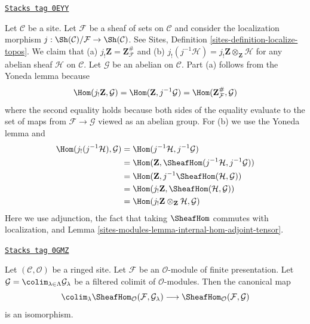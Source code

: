 \begin{remark}
\label{sites-modules-remark-j-shriek-tensor}
\href{https://stacks.math.columbia.edu/tag/0EYY}{\texttt{Stacks tag 0EYY}}

Let $\mathcal{C}$ be a site. Let $\mathcal{F}$ be a sheaf of
sets on $\mathcal{C}$ and consider the localization morphism
$j : \Sh(\mathcal{C})/\mathcal{F} \to \Sh(\mathcal{C})$.
See Sites, Definition \ref{sites-definition-localize-topos}.
We claim that (a) $j_!\mathbf{Z} = \mathbf{Z}_\mathcal{F}^\#$
and (b) $j_!(j^{-1}\mathcal{H}) = j_!\mathbf{Z} \otimes_\mathbf{Z} \mathcal{H}$
for any abelian sheaf $\mathcal{H}$ on $\mathcal{C}$.
Let $\mathcal{G}$ be an abelian on $\mathcal{C}$.
Part (a) follows from the Yoneda lemma because
$$
\Hom(j_!\mathbf{Z}, \mathcal{G}) =
\Hom(\mathbf{Z}, j^{-1}\mathcal{G}) =
\Hom(\mathbf{Z}_\mathcal{F}^\#, \mathcal{G})
$$
where the second equality holds because both sides of
the equality evaluate to the set of maps from $\mathcal{F} \to \mathcal{G}$
viewed as an abelian group. For (b) we use the Yoneda lemma and
\begin{align*}
\Hom(j_!(j^{-1}\mathcal{H}), \mathcal{G})
& =
\Hom(j^{-1}\mathcal{H}, j^{-1}\mathcal{G}) \\
& =
\Hom(\mathbf{Z}, \SheafHom(j^{-1}\mathcal{H}, j^{-1}\mathcal{G})) \\
& =
\Hom(\mathbf{Z}, j^{-1}\SheafHom(\mathcal{H}, \mathcal{G})) \\
& =
\Hom(j_!\mathbf{Z}, \SheafHom(\mathcal{H}, \mathcal{G})) \\
& =
\Hom(j_!\mathbf{Z} \otimes_\mathbf{Z} \mathcal{H}, \mathcal{G})
\end{align*}
Here we use adjunction, the fact that taking $\SheafHom$ commutes
with localization, and Lemma \ref{sites-modules-lemma-internal-hom-adjoint-tensor}.
\end{remark}

\begin{lemma}
\label{sites-modules-lemma-hom-finite-presentation-colimit}
\href{https://stacks.math.columbia.edu/tag/0GMZ}{\texttt{Stacks tag 0GMZ}}

Let $(\mathcal{C}, \mathcal{O})$ be a ringed site.
Let $\mathcal{F}$ be an $\mathcal{O}$-module of finite presentation. Let
$\mathcal{G} = \colim_{\lambda \in \Lambda} \mathcal{G}_\lambda$
be a filtered colimit of $\mathcal{O}$-modules. Then the canonical map
$$
\colim_\lambda \SheafHom_\mathcal{O}(\mathcal{F}, \mathcal{G}_\lambda)
\longrightarrow
\SheafHom_\mathcal{O}(\mathcal{F}, \mathcal{G})
$$
is an isomorphism.
\end{lemma}

